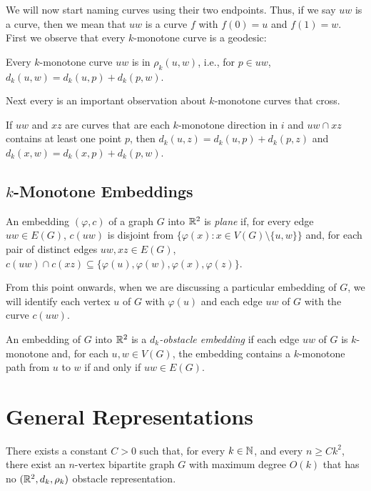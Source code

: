 \documentclass{patmorin}
\begin{document}
We will now start naming curves using their two endpoints.  Thus,
if we say $uw$ is a curve, then we mean that $uw$ is a curve $f$ with
$f(0)=u$ and $f(1)=w$.  First we observe that every $k$-monotone curve
is a geodesic:

\begin{obs}
   Every $k$-monotone curve $uw$ is in $\rho_k(u,w)$, i.e., for $p\in
   uw$, $d_k(u,w)=d_k(u,p)+d_k(p,w)$.
\end{obs}

Next every is an important observation about $k$-monotone curves that cross.

\begin{obs}
   If $uw$ and $xz$ are curves that are each $k$-monotone direction in $i$
   and $uw\cap xz$ contains at least one point $p$, then $d_k(u,z) =
   d_k(u,p)+d_k(p,z)$ and $d_k(x,w)=d_k(x,p)+d_k(p,w)$.
\end{obs}

\subsection{$k$-Monotone Embeddings}

An embedding $(\varphi,c)$ of a graph $G$ into $\mathbb{R}^2$
is \emph{plane} if, for every edge $uw\in E(G)$, $c(uw)$
is disjoint from $\{\varphi(x) : x\in V(G)\setminus\{u,w\}\}$
and, for each pair of distinct edges $uw,xz\in E(G)$, $c(uw)\cap
c(xz)\subseteq\{\varphi(u),\varphi(w),\varphi(x),\varphi(z)\}$. 

From this point onwards, when we are discussing a particular embedding
of $G$, we will identify each vertex $u$ of $G$ with $\varphi(u)$ and
each edge $uw$ of $G$ with the curve $c(uw)$.

An embedding of $G$ into $\mathbb{R}^2$ is a \emph{$d_k$-obstacle embedding} if each edge $uw$ of $G$ is $k$-monotone and, for each $u,w\in V(G)$, the embedding contains a $k$-monotone path from $u$ to $w$ if and only if $uw\in E(G)$.


\section{General Representations}

\begin{thm}
  There exists a constant $C>0$ such that, for every $k\in \mathbb{N}$, and every
  $n\ge Ck^2$, there exist an $n$-vertex bipartite graph $G$ with maximum
  degree $O(k)$ that has no $(\mathbb{R}^2,d_k,\rho_k)$ obstacle representation.
\end{thm}
\end{document}
